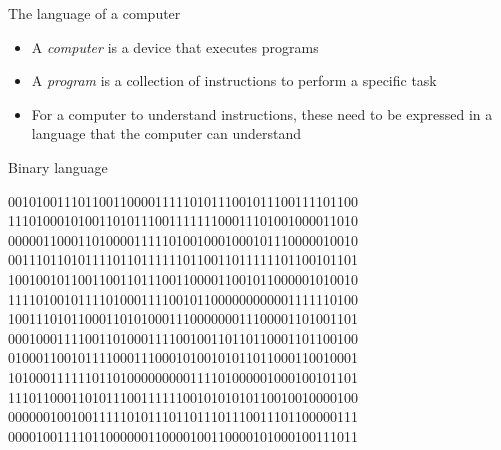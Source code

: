 

\begin{frame}{The language of a computer}
  \begin{itemize}[<+->]
  \item A \textit{computer} is a device that executes programs
  \item A \textit{program} is a collection of instructions to perform a specific
    task
  \item For a computer to understand instructions, these need to be expressed in a
    language that the computer can understand
  \end{itemize}

\end{frame}

\begin{frame}[fragile]{Binary language}

\begin{semiverbatim}
{\color{gray}00101001110110011000011111010111001011100111101100
11101000101001101011100111111100011101001000011010
00000110001101000011111010010001000101110000010010
00111011010111101101111110110011011111101100101101
10010010110011001101110011000011001011000001010010
11110100101111010001111001011000000000001111110100
10011101011000110101000111000000011100001101001101
00010001111001101000111100100110110110001101100100
01000110010111100011100010100101011011000110010001
10100011111101101000000000111101000001000100101101
11101100011010111001111110010101010110010010000100
00000010010011111010111011011101110011101100000111
00001001111011000000110000100110000101000100111011}\end{semiverbatim}


\end{frame}

